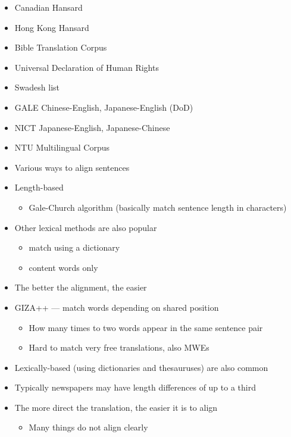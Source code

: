 \documentclass[a4paper,landscape,headrule,footrule,dvips]{foils}
\begin{document}
\begin{CJK}{UTF8}{min}
\begin{itemize}
\end{itemize}



\begin{itemize}
\item Canadian Hansard
\item Hong Kong Hansard
\item Bible Translation Corpus
\item Universal Declaration of Human Rights
\item Swadesh list
\item GALE Chinese-English, Japanese-English (DoD)
\item NICT Japanese-English, Japanese-Chinese
\item NTU Multilingual Corpus
\end{itemize}

\begin{itemize}
\item Various ways to align sentences
\item Length-based
  \begin{itemize}
  \item Gale-Church algorithm (basically match sentence length in characters)
  \end{itemize}
\item Other lexical methods are also popular
  \begin{itemize}
  \item match using a dictionary
  \item content words only
  \end{itemize}
\item The better the alignment, the easier
\end{itemize}

\begin{itemize}
\item GIZA++ --- match words depending on shared position
  \begin{itemize}
  \item How many times to two words appear in the same sentence pair
  \item Hard to match very free translations, also MWEs
  \end{itemize}
\item Lexically-based (using dictionaries and thesauruses) are also common
\item Typically newspapers may have length differences of up to a third
\item The more direct the translation, the easier it is to align 
  \begin{itemize}
  \item Many things do not align clearly
  \end{itemize}
\end{itemize}


\end{CJK}
\end{document}
